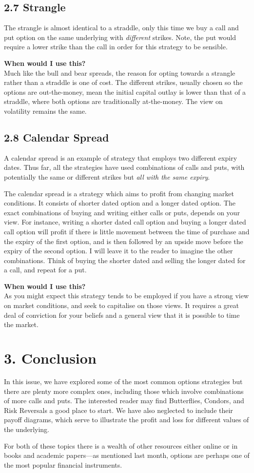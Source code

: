 \documentclass[11pt]{article}
\begin{document}
\subsection*{2.7 Strangle}
The strangle is almost identical to a straddle, only this time we buy a call and put option on the same underlying with \textit{different} strikes. Note, the put would require a lower strike than the call in order for this strategy to be sensible.

\textbf{When would I use this?} \\ 
Much like the bull and bear spreads, the reason for opting towards a strangle rather than a straddle is one of cost. The different strikes, usually chosen so the options are out-the-money, mean the initial capital outlay is lower than that of a straddle, where both options are traditionally at-the-money. The view on volatility remains the same.

\subsection*{2.8 Calendar Spread}
A calendar spread is an example of strategy that employs two different expiry dates. Thus far, all the strategies have used combinations of calls and puts, with potentially the same or different strikes but \textit{all with the same expiry}.

The calendar spread is a strategy which aims to profit from changing market conditions. It consists of shorter dated option and a longer dated option. The exact combinations of buying and writing either calls or puts, depends on your view. For instance, writing a shorter dated call option and buying a longer dated call option will profit if there is little movement between the time of purchase and the expiry of the first option, and is then followed by an upside move before the expiry of the second option. I will leave it to the reader to imagine the other combinations. Think of buying the shorter dated and selling the longer dated for a call, and repeat for a put.

\textbf{When would I use this?} \\ 
As you might expect this strategy tends to be employed if you have a strong view on market conditions, and seek to capitalise on those views. It requires a great deal of conviction for your beliefs and a general view that it is possible to time the market. 

\section*{3. Conclusion}
In this issue, we have explored some of the most common options strategies but there are plenty more complex ones, including those which involve combinations of more calls and puts. The interested reader may find Butterflies, Condors, and Risk Reversals a good place to start. We have also neglected to include their payoff diagrams, which serve to illustrate the profit and loss for different values of the underlying. 

For both of these topics there is a wealth of other resources either online or in books and academic papers––as mentioned last month, options are perhaps one of the most popular financial instruments. 
\end{document}
